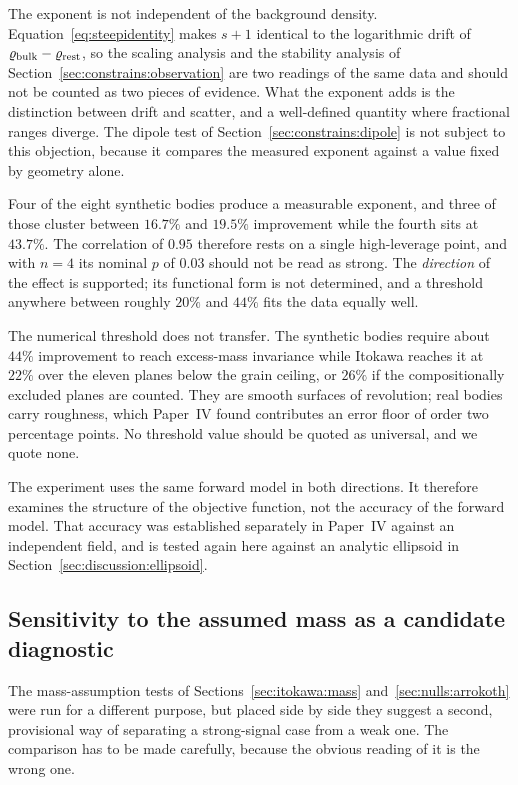 The exponent is not independent of the background density.
Equation~\eqref{eq:steepidentity} makes $s+1$ identical to the logarithmic
drift of $\varrho_{\mathrm{bulk}}-\varrho_{\mathrm{rest}}$, so the scaling analysis and the stability
analysis of Section~\ref{sec:constrains:observation} are two readings of the
same data and should not be counted as two pieces of evidence. What the
exponent adds is the distinction between drift and scatter, and a
well-defined quantity where fractional ranges diverge. The dipole test of
Section~\ref{sec:constrains:dipole} is not subject to this objection,
because it compares the measured exponent against a value fixed by geometry
alone.

Four of the eight synthetic bodies produce a measurable exponent, and three
of those cluster between $16.7\%$ and $19.5\%$ improvement while the fourth
sits at $43.7\%$. The correlation of $0.95$ therefore rests on a single
high-leverage point, and with $n=4$ its nominal $p$ of $0.03$ should not be
read as strong. The \emph{direction} of the effect is supported; its
functional form is not determined, and a threshold anywhere between roughly
$20\%$ and $44\%$ fits the data equally well.

The numerical threshold does not transfer. The synthetic bodies require
about $44\%$ improvement to reach excess-mass invariance while Itokawa
reaches it at $22\%$ over the eleven planes below the grain ceiling, or $26\%$ if the
compositionally excluded planes are counted. They are smooth surfaces of
revolution; real bodies carry roughness, which Paper~IV found contributes an
error floor of order two percentage points. No threshold value should be
quoted as universal, and we quote none.

The experiment uses the same forward model in both directions. It therefore
examines the structure of the objective function, not the accuracy of the
forward model. That accuracy was established separately in Paper~IV against
an independent field, and is tested again here against an analytic ellipsoid
in Section~\ref{sec:discussion:ellipsoid}.

\subsection{Sensitivity to the assumed mass as a candidate diagnostic}
\label{sec:constrains:mass}

The mass-assumption tests of Sections~\ref{sec:itokawa:mass}
and~\ref{sec:nulls:arrokoth} were run for a different purpose, but placed
side by side they suggest a second, provisional way of separating a
strong-signal case from a weak one. The comparison has to be made carefully,
because the obvious reading of it is the wrong one.

